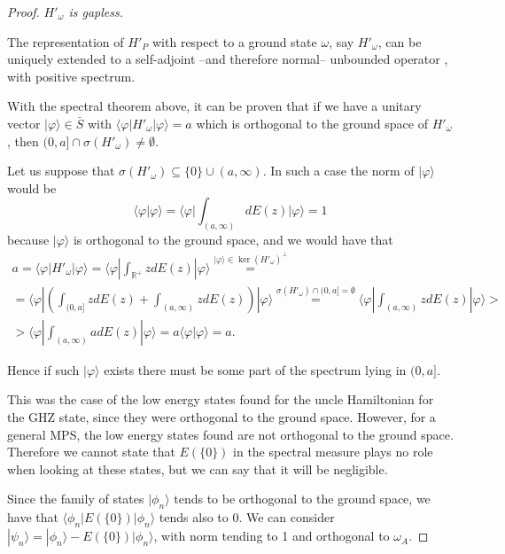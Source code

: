 \documentclass[cmp]{svjour}
\newcommand{\w}{\omega}
\newcommand{\R}{\mathbb{R}}
\newcommand{\bra}[1]{\langle #1|}
\newcommand{\ket}[1]{|#1\rangle}
\newcommand{\braket}[2]{\langle #1|#2\rangle}
\begin{document}
\begin{proof} {\it $H'_\w$ is gapless.}

    \noindent The representation of $H'_P$ with respect to a ground state $\omega$, say $H'_\omega$, can be uniquely extended to a self-adjoint --and therefore normal-- unbounded operator \cite{conway}, with positive spectrum.

    With the spectral theorem above, it can be proven that if we have a unitary vector $\ket{\varphi}\in \bar{S}$ with $\bra{\varphi}H'_\w\ket{\varphi}=a$ which is orthogonal to the ground space of $H'_\w$, then $(0,a]\cap \sigma(H'_\w)\ne\emptyset$.

    Let us suppose that $\sigma(H'_\omega)\subseteq \{0\}\cup (a,\infty)$. In such a case the norm of $\ket{\varphi}$ would be
    \begin{equation}
        \braket{\varphi}{\varphi}=\bra{\varphi}\int_{(a,\infty)} dE(z)\ket{\varphi}=1
    \end{equation}
    \noindent because $\ket{\varphi}$ is orthogonal to the ground space, and we would have that
    \begin{gather*}
        a=\bra{\varphi}H'_\w\ket{\varphi}=\bra{\varphi}\int_{\R^+} zdE(z)\ket{\varphi}\stackrel{\ket{\varphi}\in  \ker(H'_\w)^\bot}{=}
        \\
        =\bra{\varphi}\left(\int_{(0,a]} zdE(z)+\int_{(a,\infty)} zdE(z)\right)\ket{\varphi}  \stackrel{\sigma(H'_\omega)\cap (0,a]=\emptyset}{=} \bra{\varphi}  \int_{(a,\infty)} zdE(z)\ket{\varphi}>
        \\
        > \bra{\varphi}\int_{(a,\infty)} adE(z)\ket{\varphi}=a \braket{\varphi}{\varphi} =a. \quad
    \end{gather*}

    Hence if such $\ket{\varphi}$ exists there must be some part of the spectrum lying in $(0,a]$.

    This was the case of the low energy states found for the uncle Hamiltonian for the GHZ state, since they were orthogonal to the ground space. However, for a general MPS, the low energy states found are not orthogonal to the ground space. Therefore we cannot state that $E(\{0\})$ in the spectral measure plays no role when looking at these states, but we can say that it will be negligible.

    Since the family of states $\ket{\phi_n}$ tends to be orthogonal to the ground space, we have that $\bra{\phi_n}E(\{0\})\ket{\phi_n}$ tends also to 0. We can consider $\ket{\psi_n}=\ket{\phi_n}-E(\{0\})\ket{\phi_n}$, with norm tending to 1 and orthogonal to $\w_A$.


\end{proof}
\end{document}
